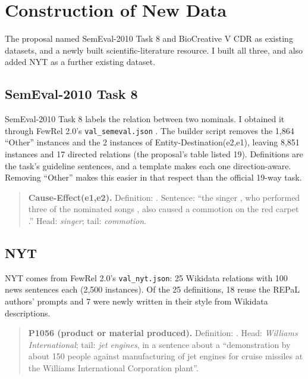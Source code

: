 \section{Construction of New Data}
\label{sec:newdata}

The proposal named SemEval-2010 Task 8 and BioCreative V CDR as existing datasets, and a newly built scientific-literature resource. I built all three, and also added NYT as a further existing dataset.

\subsection{SemEval-2010 Task 8}
SemEval-2010 Task 8 \citep{hendrickx2010semeval} labels the relation between two nominals. I obtained it through FewRel 2.0's \texttt{val\_semeval.json} \citep{gao2019fewrel}. The builder script removes the 1,864 ``Other'' instances and the 2 instances of Entity-Destination(e2,e1), leaving 8,851 instances and 17 directed relations (the proposal's table listed 19). Definitions are the task's guideline sentences, and a template makes each one direction-aware. Removing ``Other'' makes this easier in that respect than the official 19-way task.

\begin{quote}\small
\textbf{Cause-Effect(e1,e2).} Definition: .
Sentence: ``the singer , who performed three of the nominated songs , also caused a commotion on the red carpet .''
Head: \emph{singer}; tail: \emph{commotion}.
\end{quote}

\subsection{NYT}
NYT comes from FewRel 2.0's \texttt{val\_nyt.json}: 25 Wikidata relations with 100 news sentences each (2,500 instances). Of the 25 definitions, 18 reuse the REPaL authors' prompts and 7 were newly written in their style from Wikidata descriptions.

\begin{quote}\small
\textbf{P1056 (product or material produced).} Definition: .
Head: \emph{Williams International}; tail: \emph{jet engines}, in a sentence about a ``demonstration by about 150 people against manufacturing of jet engines for cruise missiles at the Williams International Corporation plant''.
\end{quote}

